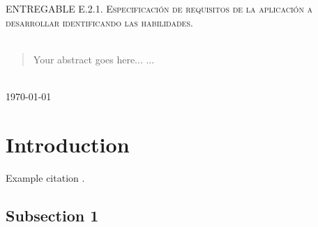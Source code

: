 \documentclass[12pt]{article} %
\begin{document}
\begin{titlepage}
\textsc{\Large ENTREGABLE E.2.1. Especificación de requisitos de la aplicación a desarrollar identificando las habilidades.}\\[0.5cm] %

\HRule \\[0.4cm]
\renewcommand{\abstractname}{RESUMEN DEL DOCUMENTO}
\begin{abstract}
Your abstract goes here...
...
\end{abstract}
\HRule \\[0.4cm]

{\large \today}\\[3cm] %


\vfill %

\end{titlepage}


\tableofcontents %

\newpage %


\section{Introduction} %

Example citation \cite{Figueredo:2009dg}.


\subsection{Subsection 1} %

\lipsum[1] %

\end{document}
